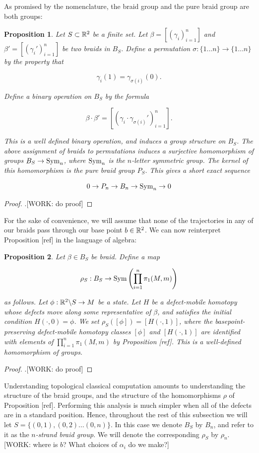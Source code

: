 \documentclass{article}
\newtheorem{proposition}{Proposition}[section]
\theoremstyle{definition}
\numberwithin{figure}{section}
\begin{document}
As promised by the nomenclature, the braid group and the pure braid group are both groups:

\begin{proposition} Let $S\subset \mathbb{R}^2$ be a finite set. Let $\beta=\left[(\gamma_i)_{i=1}^n\right]$ and $\beta'=\left[(\gamma_i')_{i=1}^n\right]$ be two braids in $B_S$. Define a permutation $\sigma: \{1...n\}\to \{1...n\}$ by the property that

$$\gamma_i(1)=\gamma_{\sigma(i)}(0).$$

Define a binary operation on $B_S$ by the formula

$$\beta \cdot \beta' = \left[\left(\gamma_i \cdot \gamma_{\sigma(i)}'\right)_{i=1}^n\right].$$

This is a well defined binary operation, and induces a group structure on $B_S$. The above assignment of braids to permutations induces a surjective homomorphism of groups $B_S\to \mathrm{Sym}_n$, where $\mathrm{Sym}_n$ is the $n$-letter symmetric group. The kernel of this homomorphism is the pure braid group $P_S$. This gives a short exact sequence

$$0\to P_n\to B_n\to \mathrm{Sym}_n\to 0$$
\end{proposition}
\begin{proof}.[WORK: do proof]
\end{proof}

For the sake of convenience, we will assume that none of the trajectories in any of our braids pass through our base point $b\in \mathbb{R}^2$. We can now reinterpret Proposition [ref] in the language of algebra:

\begin{proposition} Let $\beta\in B_S$ be braid. Define a map

$$\rho_S:B_S\to \mathrm{Sym}\left(\prod_{i=1}^n\pi_1(M,m)\right)$$

 as follows. Let $\phi:\mathbb{R}^2\backslash S\to M$ be a state. Let $H$ be a defect-mobile homotopy whose defects move along some representative of $\beta$, and satisfies the initial condition $H(\cdot,0)=\phi$. We set $\rho_S([\phi])=[H(\cdot,1)]$, where the basepoint-preserving defect-mobile homotopy classes $[\phi]$ and $[H(\cdot,1)]$ are identified with elements of $\prod_{i=1}^n\pi_1(M,m)$ by Proposition [ref]. This is a well-defined homomorphism of groups.
\end{proposition}
\begin{proof}.[WORK: do proof]
\end{proof}

Understanding topological classical computation amounts to understanding the structure of the braid groups, and the structure of the homomorphisms $\rho$ of Proposition [ref]. Performing this analysis is much simpler when all of the defects are in a standard position. Hence, throughout the rest of this subsection we will let $S=\{(0,1), (0,2)...(0,n)\}$. In this case we denote $B_S$ by $B_n$, and refer to it as the \textit{$n$-strand braid group}. We will denote the corresponding $\rho_S$ by $\rho_n$. [WORK: where is $b$? What choices of $\alpha_i$ do we make?]
\end{document}
